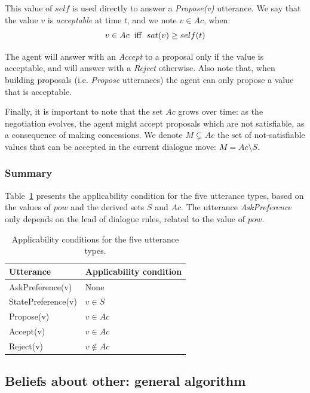 \documentclass[sigconf]{aamas}  %
\begin{document}
	This value of $self$ is used directly to answer a \emph{Propose(v)} utterance. We say that the value $v$ is \emph{acceptable} at time $t$, and we note $v \in Ac$, when:
	\begin{equation}
	v\in Ac\hspace{2mm}\mathrm{iff}\hspace{2mm}sat(v) \geq self(t)
	\end{equation}
	
	The agent will answer with an \emph{Accept} to a proposal only if the value is acceptable, and will answer with a \emph{Reject} otherwise. Also note that, when building proposals (i.e. \emph{Propose} utterances) the agent can only propose a value that is acceptable.
	
	Finally, it is important to note that the set $Ac$ grows over time: as the negotiation evolves, the agent might accept proposals which are not satisfiable, as a consequence of making concessions. We denote $M\varsubsetneq Ac$ the set of not-satisfiable values that can be accepted in the current dialogue move: $M = Ac\setminus S$.
	
	\subsubsection{Summary}	
	Table~\ref{tab:utt} presents the applicability condition for the five utterance types, based on the values of $pow$ and the derived sets $S$ and $Ac$. The utterance \emph{AskPreference} only depends on the lead of dialogue rules, related to the value of $pow$.
		
		\begin{table}
			\centering
				\caption{Applicability conditions for the five utterance types.}
				\label{tab:utt}
			\begin{tabular}  {|l|l|}
				\hline
				Utterance & Applicability condition \\
				\hline
				AskPreference(v) & None \\
				\hline 
				StatePreference(v) & $v\in S$ \\
				\hline 
				Propose(v) & $v\in Ac$ \\
				\hline
				Accept(v)  & $v\in Ac$ \\
				\hline
				Reject(v) & $v\notin Ac$ \\
				\hline
			\end{tabular}
		\end{table}
	
	\subsection{Beliefs about other: general algorithm}
	
\end{document}
